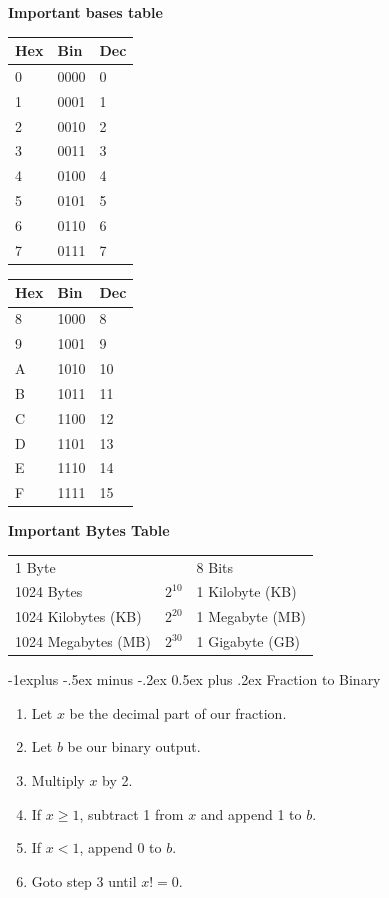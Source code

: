 \documentclass[letterpaper, 8pt]{extarticle}
\makeatletter
\renewcommand{\subsection}{\@startsection{subsection}{2}{0mm}%
                                {-1explus -.5ex minus -.2ex}%
                                {0.5ex plus .2ex}%
                                {\normalfont\small\bfseries}}
\makeatother
\begin{document}
\begin{multicols*}{6}
	\textbf{Important bases table}
	\begin{center}
		\begin{tabular}[!ht]{@{}lll@{}}
			\toprule
			Hex & Bin  & Dec \\
			\midrule
			0   & 0000 & 0   \\
			1   & 0001 & 1   \\
			2   & 0010 & 2   \\
			3   & 0011 & 3   \\
			4   & 0100 & 4   \\
			5   & 0101 & 5   \\
			6   & 0110 & 6   \\
			7   & 0111 & 7   \\
			\bottomrule
		\end{tabular}
		\begin{tabular}[!ht]{@{}lll@{}}
			\toprule
			Hex & Bin  & Dec \\
			\midrule
			8   & 1000 & 8   \\
			9   & 1001 & 9   \\
			A   & 1010 & 10  \\
			B   & 1011 & 11  \\
			C   & 1100 & 12  \\
			D   & 1101 & 13  \\
			E   & 1110 & 14  \\
			F   & 1111 & 15  \\
			\bottomrule
		\end{tabular}
	\end{center}

        \textbf{Important Bytes Table}
        \begin{center}
            \begin{tabulary}{\linewidth}{@{}LLL@{}}  Byte              &          & 8 Bits \\
                1024 Bytes          & $2^{10}$ & 1 Kilobyte (KB) \\
                1024 Kilobytes (KB) & $2^{20}$ & 1 Megabyte (MB) \\
                1024 Megabytes (MB) & $2^{30}$ & 1 Gigabyte (GB) \\
                \bottomrule
            \end{tabulary}
        \end{center}

	\subsection{Fraction to Binary}
	\begin{enumerate}
		\item Let $x$ be the decimal part of our fraction.
		\item Let $b$ be our binary output.
		\item Multiply $x$ by 2.
		\item If $x \ge 1$, subtract 1 from $x$ and append 1 to $b$.
		\item If $x < 1$, append 0 to $b$.
		\item Goto step 3 until $x != 0$.
	\end{enumerate}


\end{multicols*}
\end{document}
